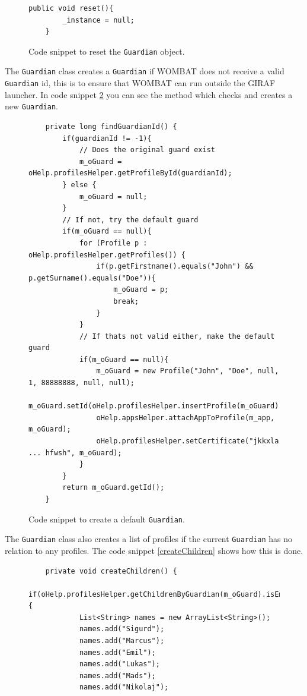 \begin{description}
\begin{figure}[H]
\begin{lstlisting}
public void reset(){
		_instance = null;
	}
\end{lstlisting}
\caption{Code snippet to reset the \texttt{Guardian} object.}%
\label{code:guardianreset}%
\end{figure}

The \texttt{Guardian} class creates a \texttt{Guardian} if WOMBAT does not receive a valid \texttt{Guardian} id, this is to ensure that WOMBAT can run outside the GIRAF launcher. In code snippet \ref{code:createGuardian} you can see the method which checks and creates a new \texttt{Guardian}.

\begin{figure}[H]
\begin{lstlisting}
	private long findGuardianId() {
		if(guardianId != -1){
			// Does the original guard exist
			m_oGuard = oHelp.profilesHelper.getProfileById(guardianId);
		} else {
			m_oGuard = null;
		}
		// If not, try the default guard
		if(m_oGuard == null){
			for (Profile p : oHelp.profilesHelper.getProfiles()) {
				if(p.getFirstname().equals("John") && p.getSurname().equals("Doe")){
					m_oGuard = p;
					break;
				}
			}
			// If thats not valid either, make the default guard
			if(m_oGuard == null){
				m_oGuard = new Profile("John", "Doe", null, 1, 88888888, null, null);				
				m_oGuard.setId(oHelp.profilesHelper.insertProfile(m_oGuard));
				oHelp.appsHelper.attachAppToProfile(m_app, m_oGuard);
				oHelp.profilesHelper.setCertificate("jkkxla ... hfwsh", m_oGuard);
			}
		} 
		return m_oGuard.getId();
	}
\end{lstlisting}
\caption{Code snippet to create a default \texttt{Guardian}.}%
\label{code:createGuardian}%
\end{figure}

The \texttt{Guardian} class also creates a list of profiles if the current \texttt{Guardian} has no relation to any profiles. The code snippet \ref{createChildren} shows how this is done.
	
	\begin{figure}[H]
\begin{lstlisting}
	private void createChildren() {		
		if(oHelp.profilesHelper.getChildrenByGuardian(m_oGuard).isEmpty()){
			List<String> names = new ArrayList<String>();
			names.add("Sigurd");
			names.add("Marcus");
			names.add("Emil");
			names.add("Lukas");
			names.add("Mads");
			names.add("Nikolaj");
			

\end{lstlisting}
\end{figure}
\end{description}
